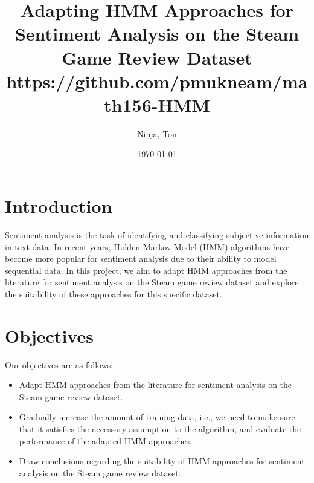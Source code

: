 \documentclass{article}
\title{Adapting HMM Approaches for Sentiment Analysis on the Steam Game Review Dataset \\ \small https://github.com/pmukneam/math156-HMM}
\author{Ninja, Ton}
\date{\today}
\begin{document}
\maketitle

\section{Introduction}
Sentiment analysis is the task of identifying and classifying subjective information in text data. In recent years, Hidden Markov Model (HMM) algorithms have become more popular for sentiment analysis due to their ability to model sequential data. In this project, we aim to adapt HMM approaches from the literature for sentiment analysis on the Steam game review dataset and explore the suitability of these approaches for this specific dataset.

\section{Objectives}
Our objectives are as follows:
\begin{itemize}
\item Adapt HMM approaches from the literature for sentiment analysis on the Steam game review dataset.
\item Gradually increase the amount of training data, i.e., we need to make sure that it satisfies the necessary assumption to the algorithm, and evaluate the performance of the adapted HMM approaches.
\item Draw conclusions regarding the suitability of HMM approaches for sentiment analysis on the Steam game review dataset.
\end{itemize}
\end{document}
